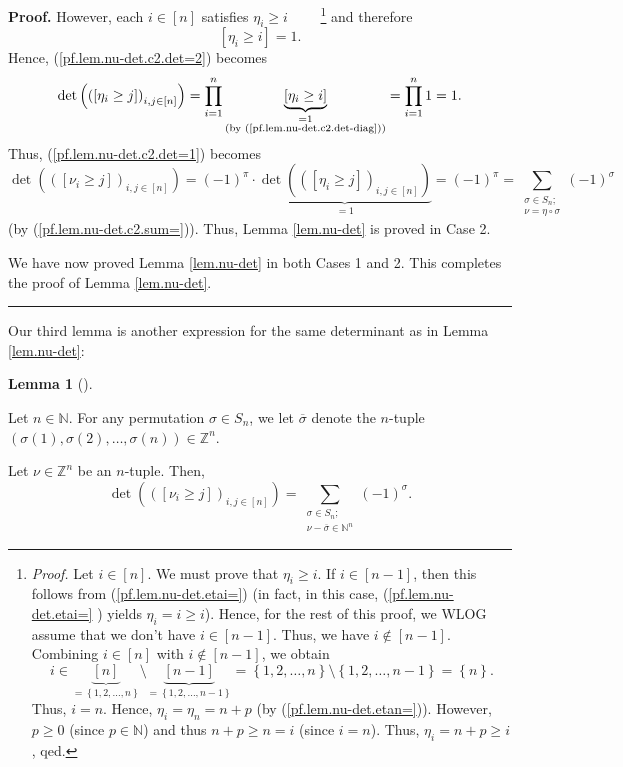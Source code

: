 \documentclass
[numbers=enddot,12pt,final,onecolumn,notitlepage,english]{scrartcl}%
\theoremstyle{definition}
\newtheorem{lem}[theo]{Lemma}
\newenvironment{lemma}[1][]
{\begin{lem}[#1]\begin{leftbar}}
{\end{leftbar}\end{lem}}
\newenvironment{proof}[1][Proof]{\noindent\textbf{#1.} }{\ \rule{0.5em}{0.5em}}
\let\sumnonlimits\sum
\let\prodnonlimits\prod
\renewcommand{\sum}{\sumnonlimits\limits}
\renewcommand{\prod}{\prodnonlimits\limits}
\newenvironment{verlong}{}{}
\begin{document}
\begin{proof}
\begin{verlong}
However, each $i\in\left[  n\right]  $ satisfies $\eta_{i}\geq i$%
\ \ \ \ \footnote{\textit{Proof.} Let $i\in\left[  n\right]  $. We must prove
that $\eta_{i}\geq i$. If $i\in\left[  n-1\right]  $, then this follows from
(\ref{pf.lem.nu-det.etai=}) (in fact, in this case, (\ref{pf.lem.nu-det.etai=}%
) yields $\eta_{i}=i\geq i$). Hence, for the rest of this proof, we WLOG
assume that we don't have $i\in\left[  n-1\right]  $. Thus, we have
$i\notin\left[  n-1\right]  $. Combining $i\in\left[  n\right]  $ with
$i\notin\left[  n-1\right]  $, we obtain%
\[
i\in\underbrace{\left[  n\right]  }_{=\left\{  1,2,\ldots,n\right\}
}\setminus\underbrace{\left[  n-1\right]  }_{=\left\{  1,2,\ldots,n-1\right\}
}=\left\{  1,2,\ldots,n\right\}  \setminus\left\{  1,2,\ldots,n-1\right\}
=\left\{  n\right\}  .
\]
Thus, $i=n$. Hence, $\eta_{i}=\eta_{n}=n+p$ (by (\ref{pf.lem.nu-det.etan=})).
However, $p\geq0$ (since $p\in\mathbb{N}$) and thus $n+p\geq n=i$ (since
$i=n$). Thus, $\eta_{i}=n+p\geq i$, qed.} and therefore
\begin{equation}
\left[  \eta_{i}\geq i\right]  =1. \label{pf.lem.nu-det.c2.det-diag}%
\end{equation}
Hence, (\ref{pf.lem.nu-det.c2.det=2}) becomes%
\[
\det\left(  \left(  \left[  \eta_{i}\geq j\right]  \right)  _{i,j\in\left[
n\right]  }\right)  =\prod_{i=1}^{n}\underbrace{\left[  \eta_{i}\geq i\right]
}_{\substack{=1\\\text{(by (\ref{pf.lem.nu-det.c2.det-diag}))}}}=\prod
_{i=1}^{n}1=1.
\]
Thus, (\ref{pf.lem.nu-det.c2.det=1}) becomes%
\[
\det\left(  \left(  \left[  \nu_{i}\geq j\right]  \right)  _{i,j\in\left[
n\right]  }\right)  =\left(  -1\right)  ^{\pi}\cdot\underbrace{\det\left(
\left(  \left[  \eta_{i}\geq j\right]  \right)  _{i,j\in\left[  n\right]
}\right)  }_{=1}=\left(  -1\right)  ^{\pi}=\sum_{\substack{\sigma\in
S_{n};\\\nu=\eta\circ\sigma}}\left(  -1\right)  ^{\sigma}%
\]
(by (\ref{pf.lem.nu-det.c2.sum=})). Thus, Lemma \ref{lem.nu-det} is proved in
Case 2. \medskip
\end{verlong}

We have now proved Lemma \ref{lem.nu-det} in both Cases 1 and 2. This
completes the proof of Lemma \ref{lem.nu-det}.
\end{proof}

Our third lemma is another expression for the same determinant as in Lemma
\ref{lem.nu-det}:

\begin{lemma}
\label{lem.nu-det2}Let $n\in\mathbb{N}$. For any permutation $\sigma\in S_{n}%
$, we let $\overline{\sigma}$ denote the $n$-tuple $\left(  \sigma\left(
1\right)  ,\sigma\left(  2\right)  ,\ldots,\sigma\left(  n\right)  \right)
\in\mathbb{Z}^{n}$.

Let $\nu\in\mathbb{Z}^{n}$ be an $n$-tuple. Then,%
\[
\det\left(  \left(  \left[  \nu_{i}\geq j\right]  \right)  _{i,j\in\left[
n\right]  }\right)  =\sum_{\substack{\sigma\in S_{n};\\\nu-\overline{\sigma
}\in\mathbb{N}^{n}}}\left(  -1\right)  ^{\sigma}.
\]

\end{lemma}
\end{document}
